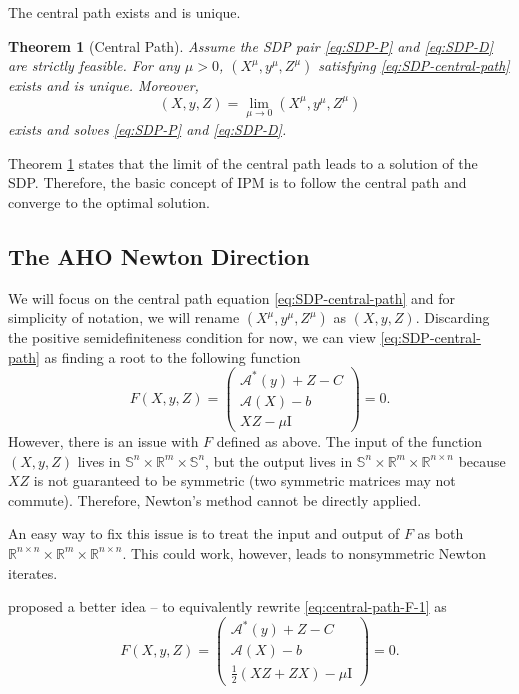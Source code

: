 \documentclass[
]{book}
\newtheorem{theorem}{Theorem}[chapter]
\theoremstyle{definition}
\theoremstyle{definition}
\theoremstyle{definition}
\theoremstyle{definition}
\theoremstyle{remark}
\begin{document}
The central path exists and is unique.

\begin{theorem}[Central Path]
\protect\hypertarget{thm:UniqueCentralPath}{}\label{thm:UniqueCentralPath}Assume the SDP pair \eqref{eq:SDP-P} and \eqref{eq:SDP-D} are strictly feasible. For any \(\mu > 0\), \((X^\mu,y^\mu,Z^\mu)\) satisfying \eqref{eq:SDP-central-path} exists and is unique. Moreover,
\[
(X,y,Z) = \lim_{\mu \rightarrow 0} (X^\mu, y^\mu, Z^\mu)
\]
exists and solves \eqref{eq:SDP-P} and \eqref{eq:SDP-D}.
\end{theorem}

Theorem \ref{thm:UniqueCentralPath} states that the limit of the central path leads to a solution of the SDP. Therefore, the basic concept of IPM is to follow the central path and converge to the optimal solution.

\subsection{The AHO Newton Direction}\label{the-aho-newton-direction}

We will focus on the central path equation \eqref{eq:SDP-central-path} and for simplicity of notation, we will rename \((X^\mu,y^\mu,Z^\mu)\) as \((X,y,Z)\). Discarding the positive semidefiniteness condition for now, we can view \eqref{eq:SDP-central-path} as finding a root to the following function
\begin{equation}
F(X,y,Z) = \begin{pmatrix}
\mathcal{A}^*(y) + Z - C \\
\mathcal{A}(X) - b \\
X Z - \mu \mathrm{I}
\end{pmatrix} = 0.
\label{eq:central-path-F-1}
\end{equation}
However, there is an issue with \(F\) defined as above. The input of the function \((X,y,Z)\) lives in \(\mathbb{S}^{n} \times \mathbb{R}^{m} \times \mathbb{S}^{n}\), but the output lives in \(\mathbb{S}^{n} \times \mathbb{R}^{m} \times \mathbb{R}^{n \times n}\) because \(XZ\) is not guaranteed to be symmetric (two symmetric matrices may not commute). Therefore, Newton's method cannot be directly applied.

An easy way to fix this issue is to treat the input and output of \(F\) as both \(\mathbb{R}^{n \times n} \times \mathbb{R}^{m} \times \mathbb{R}^{n \times n}\). This could work, however, leads to nonsymmetric Newton iterates.

\citep{alizadeh98siopt-primal} proposed a better idea -- to equivalently rewrite \eqref{eq:central-path-F-1} as
\begin{equation}
F(X,y,Z) = \begin{pmatrix}
\mathcal{A}^*(y) + Z - C \\
\mathcal{A}(X) - b \\
\frac{1}{2}(X Z + Z X) - \mu \mathrm{I}
\end{pmatrix} = 0.
\label{eq:central-path-F-2}
\end{equation}
\end{document}
